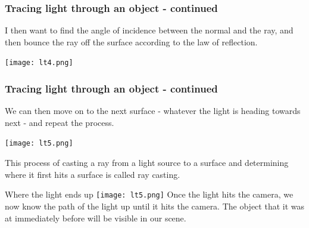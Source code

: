 \documentclass[12pt]{beamer}
\begin{document}
  \begin{frame}
    \frametitle{Tracing light through an object - continued}

    I then want to find the angle of incidence between the normal and the ray, and then bounce the ray off the surface according to the law of reflection.

    \texttt{[image: lt4.png]}

  \end{frame}


  \begin{frame}
    \frametitle{Tracing light through an object - continued}

    We can then move on to the next surface - whatever the light is heading towards next - and repeat the process.

    \texttt{[image: lt5.png]}

    This process of casting a ray from a light source to a surface and determining where it first hits a surface is called ray casting.

  \end{frame}

  \begin{frame}{Where the light ends up}
    \texttt{[image: lt5.png]}
    Once the light hits the camera, we now know the path of the light up until it hits the camera. The object that it was at immediately before will be visible in our scene.

  \end{frame}
\end{document}
